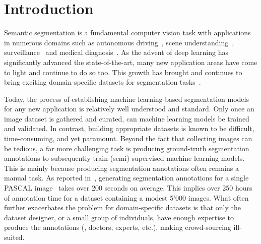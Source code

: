 \section{Introduction}
\label{sec:full_weakintro}
Semantic segmentation is a fundamental computer vision task with applications in numerous domains such as autonomous driving~, scene understanding~, surveillance~ and medical diagnosis~. As the advent of deep learning has significantly advanced the state-of-the-art, many new application areas have come to light and continue to do so too. This growth has brought and continues to bring exciting domain-specific datasets for segmentation tasks~. 

Today, the process of establishing machine learning-based segmentation models for any new application is relatively well understood and standard. Only once an image dataset is gathered and curated, can machine learning models be trained and validated. In contrast, building appropriate datasets is known to be difficult, time-consuming, and yet paramount. Beyond the fact that collecting images can be tedious, a far more challenging task is producing ground-truth segmentation annotations to subsequently train (semi) supervised machine learning models. This is mainly because producing segmentation annotations often remains a manual task. As reported in~, generating segmentation annotations for a single PASCAL image~ takes over 200 seconds on average. This implies over 250 hours of annotation time for a dataset containing a modest 5'000 images. What often further exacerbates the problem for domain-specific datasets is that only the dataset designer, or a small group of individuals, have enough expertise to produce the annotations (\eg, doctors, experts, etc.), making crowd-sourcing ill-suited. 

